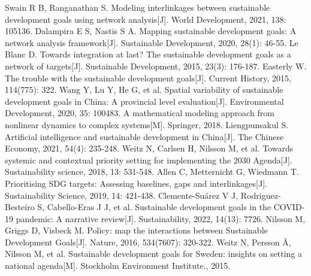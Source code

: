 \documentclass[12pt]{article}  %
\begin{document}
\begin{thebibliography}{99}
\addtolength{\itemsep}{-0.5 em} %
\setlength{\itemsep}{-5pt}
 Swain R B, Ranganathan S. Modeling interlinkages between sustainable development goals using network analysis[J]. World Development, 2021, 138: 105136.
 Dalampira E S, Nastis S A. Mapping sustainable development goals: A network analysis framework[J]. Sustainable Development, 2020, 28(1): 46-55.
 Le Blanc D. Towards integration at last? The sustainable development goals as a network of targets[J]. Sustainable Development, 2015, 23(3): 176-187.
 Easterly W. The trouble with the sustainable development goals[J]. Current History, 2015, 114(775): 322.
 Wang Y, Lu Y, He G, et al. Spatial variability of sustainable development goals in China: A provincial level evaluation[J]. Environmental Development, 2020, 35: 100483.
 A mathematical modeling approach from nonlinear dynamics to complex systems[M]. Springer, 2018.
 Liengpunsakul S. Artificial intelligence and sustainable development in China[J]. The Chinese Economy, 2021, 54(4): 235-248.
 Weitz N, Carlsen H, Nilsson M, et al. Towards systemic and contextual priority setting for implementing the 2030 Agenda[J]. Sustainability science, 2018, 13: 531-548.
 Allen C, Metternicht G, Wiedmann T. Prioritising SDG targets: Assessing baselines, gaps and interlinkages[J]. Sustainability Science, 2019, 14: 421-438.
 Clemente-Suárez V J, Rodriguez-Besteiro S, Cabello-Eras J J, et al. Sustainable development goals in the COVID-19 pandemic: A narrative review[J]. Sustainability, 2022, 14(13): 7726.
 Nilsson M, Griggs D, Visbeck M. Policy: map the interactions between Sustainable Development Goals[J]. Nature, 2016, 534(7607): 320-322.
 Weitz N, Persson Å, Nilsson M, et al. Sustainable development goals for Sweden: insights on setting a national agenda[M]. Stockholm Environment Institute., 2015.
\end{thebibliography}


\end{document}

